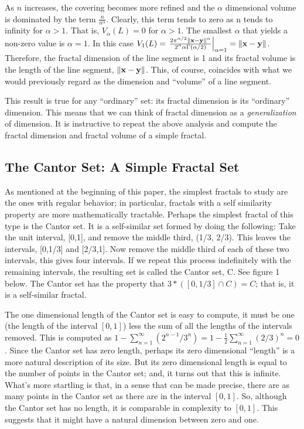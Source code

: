 As $n$ increases, the covering becomes more refined and 
the $\alpha$ dimensional volume is dominated by the term
$\frac{n}{n^\alpha}$. Clearly, this term tends to zero as n tends to
infinity for $\alpha > 1$. That is, $V_\alpha(L) = 0$ for $\alpha >
1$. The smallest $\alpha$ that yields a non-zero value is $\alpha =
1$. In this case 
$
V_1(L) = \left. \frac{2\pi^{\alpha / 2} \|{\bf x} - {\bf
y}\|^\alpha}{2^\alpha \alpha \Gamma(\alpha / 2)} \right|_{\alpha=1} = \| {\bf
x} - {\bf y}\|$. 
Therefore, the fractal dimension of the line segment is
1 and its fractal volume is the length of the line segment, $\|{\bf x} - {\bf
y}\|$. This, of course, coincides with what we would previously regard
as the dimension and ``volume'' of a line segment.

This result is true for any ``ordinary'' set: its fractal dimension is its
``ordinary'' dimension. This means that we can think of fractal
dimension as a {\it generalization} of dimension. It is 
instructive to repeat the above analysis and compute the fractal dimension 
and fractal volume of a simple fractal.


\subsection{The Cantor Set: A Simple Fractal Set}

As mentioned at the beginning of this paper, the simplest fractals to
study are the ones with regular behavior; in particular, fractals with a
self similarity property are more mathematically tractable. Perhaps
the simplest fractal of this type is 
the Cantor set. It is a self-similar set formed by doing the following:
Take the unit interval, [0,1], and remove the middle third, (1/3,
2/3). This leaves the intervals, [0,1/3] and [2/3,1]. Now remove the
middle third of each of these two intervals, this gives four
intervals.
If we repeat this process indefinitely with the remaining
intervals, the resulting set is called the Cantor set, C. See 
figure 1 below. The Cantor
set has the property that $3 * \left([0,1/3] \cap C\right) = C$; that is, it is a
self-similar fractal. 

The one dimensional length of the Cantor set is
easy to compute, it must be one (the length of the interval $[0,1]$) 
less the sum of all the lengths of the
intervals removed. This is computed as $1
- \sum_{n=1}^\infty (2^{n-1}/3^n) = 1 - \frac{1}{2}
\sum_{n=1}^\infty (2/3)^n = 0$. Since the Cantor set has zero length,
perhaps its zero dimensional ``length'' is a more natural description
of its size. But its zero dimensional length is equal to the 
number of points in the Cantor set; and, it turns out that this is infinite. 
What's more startling is
that, in a sense that can be made precise, there are as many points in
the Cantor set as there are in the interval $[0,1]$. So, although the 
Cantor set has no length, it is comparable in complexity
to $[0,1]$. This suggests that it might have a natural dimension
between zero and one.

